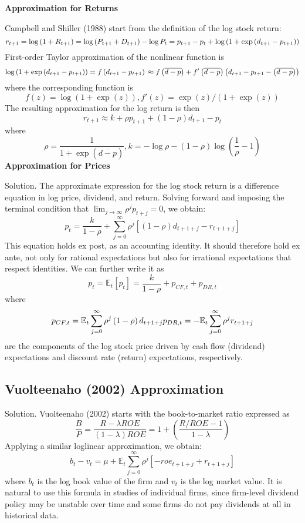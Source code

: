 \documentclass[
]{book}
\begin{document}
\textbf{Approximation for Returns}

Campbell and Shiller (1988) start from the definition of the log stock return:
\[
r_{t+1} =\log\left(1+R_{t+1}\right)=\log\left(P_{t+1}+D_{t+1}\right)-\log P_{t}\\
    =p_{t+1}-p_{t}+\log\left(1+\exp\left(d_{t+1}-p_{t+1}\right)\right)
\]
First-order Taylor approximation of the nonlinear function is
\[
\log\left(1+\exp\left(d_{t+1}-p_{t+1}\right)\right) =f\left(d_{t+1}-p_{t+1}\right)\\
\approx f\left(\overline{d-p}\right)+f'\left(\overline{d-p}\right)\left(d_{t+1}-p_{t+1}-\left(\overline{d-p}\right)\right)
\]
where the corresponding function is
\[
f\left(z\right)=\log\left(1+\exp\left(z\right)\right),f'\left(z\right)=\exp\left(z\right)/\left(1+\exp\left(z\right)\right)
\]
The resulting approximation for the log return is then
\[
r_{t+1}\approx k+\rho p_{t+1}+\left(1-\rho\right)d_{t+1}-p_{t}
\]
where
\[
\rho=\frac{1}{1+\exp\left(\overline{d-p}\right)},k=-\log\rho-\left(1-\rho\right)\log\left(\frac{1}{\rho}-1\right)
\]
\textbf{Approximation for Prices}

Solution. The approximate expression for the log stock return is a difference equation in log price, dividend, and return. Solving forward and imposing the terminal condition that \(\lim_{j\to\infty}\rho^{j}p_{t+j}=0\), we obtain:
\[
p_{t}=\frac{k}{1-\rho}+\sum_{j=0}^{\infty}\rho^{j}\left[\left(1-\rho\right)d_{t+1+j}-r_{t+1+j}\right]
\]
This equation holds ex post, as an accounting identity. It should therefore hold ex ante, not only for rational expectations but also for irrational expectations that respect identities. We can further write it as
\[
p_{t}=\mathbb{E}_{t}\left[p_{t}\right]=\frac{k}{1-\rho}+p_{CF,t}+p_{DR,t}
\]
where
\[
p_{CF,t}=\mathbb{E}_{t}\sum_{j=0}^{\infty}\rho^{j}\left(1-\rho\right)d_{t+1+j}\\
p_{DR,t}=-\mathbb{E}_{t}\sum_{j=0}^{\infty}\rho^{j}r_{t+1+j}
\]
are the components of the log stock price driven by cash flow (dividend) expectations and discount rate (return) expectations, respectively.

\hypertarget{vuolteenaho-2002-approximation}{%
\subsection{Vuolteenaho (2002) Approximation}\label{vuolteenaho-2002-approximation}}

Solution. Vuolteenaho (2002) starts with the book-to-market ratio expressed as
\[
\frac{B}{P}=\frac{R-\lambda ROE}{\left(1-\lambda\right)ROE}=1+\left(\frac{R/ROE-1}{1-\lambda}\right)
\]
Applying a similar loglinear approximation, we obtain:
\[
b_{t}-v_{t}=\mu+\mathbb{E}_{t}\sum_{j=0}^{\infty}\rho^{j}\left[-roe_{t+1+j}+r_{t+1+j}\right]
\]
where \(b_{t}\) is the log book value of the firm and \(v_{t}\) is the log market value. It is natural to use this formula in studies of individual firms, since firm-level dividend policy may be unstable over time and some firms do not pay dividends at all in historical data.
\end{document}
